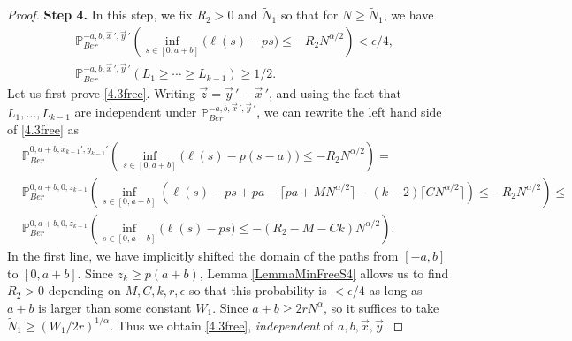 \begin{proof}
		\noindent\textbf{Step 4.} In this step, we fix $R_2 > 0$ and $\tilde{N}_1$ so that for $N\geq\tilde{N}_1$, we have
		\begin{align}
		&\mathbb{P}^{-a, b, \vec{x}\,', \vec{y}\,'}_{Ber} \left( \inf_{s\in[0,a+b]} \big(\ell(s) - ps\big) \leq -R_2 N^{\alpha/2} \right) < \epsilon/4, \label{4.3free}\\
		&\mathbb{P}^{-a, b, \vec{x}\,', \vec{y}\,'}_{Ber}(L_1 \geq \cdots \geq L_{k-1}) \geq 1/2. \label{4.3intersect}
		\end{align}
		Let us first prove \eqref{4.3free}. Writing $\vec{z} = \vec{y}\,' - \vec{x}\,'$, and using the fact that $L_1,\dots,L_{k-1}$ are independent under $\mathbb{P}^{-a, b, \vec{x}\,', \vec{y}\,'}_{Ber}$, we can rewrite the left hand side of \eqref{4.3free} as
		\begin{equation}\label{4.3R2}
		\begin{split}
		& \mathbb{P}^{0, a+b, x_{k-1}', y_{k-1}'}_{Ber} \left( \inf_{s\in[0,a+b]} \big(\ell(s) - p(s-a)\big) \leq -R_2 N^{\alpha/2} \right) =\\
		&\mathbb{P}^{0, a+b, 0, z_{k-1}}_{Ber} \left( \inf_{s\in[0,a+b]} \left(\ell(s) - ps + pa - \lceil pa + MN^{\alpha/2}\rceil - (k-2)\lceil CN^{\alpha/2}\rceil\right) \leq -R_2 N^{\alpha/2} \right) \leq \\
		& \mathbb{P}^{0, a+b, 0, z_{k-1}}_{Ber} \left( \inf_{s\in[0,a+b]} \big(\ell(s) - ps\big) \leq -(R_2 - M - Ck) N^{\alpha/2} \right).
		\end{split}
		\end{equation}
		In the first line, we have implicitly shifted the domain of the paths from $[-a,b]$ to $[0,a+b]$. Since $z_k\geq p(a+b)$, Lemma \ref{LemmaMinFreeS4} allows us to find $R_2>0$ depending on $M,C,k,r,\epsilon$ so that this probability is $<\epsilon/4$ as long as $a+b$ is larger than some constant $W_1$. Since $a+b \geq 2rN^\alpha$, so it suffices to take $\tilde{N}_1 \geq (W_1/2r)^{1/\alpha}$. Thus we obtain \eqref{4.3free}, \textit{independent} of $a,b,\vec{x},\vec{y}$.
		

\end{proof}
